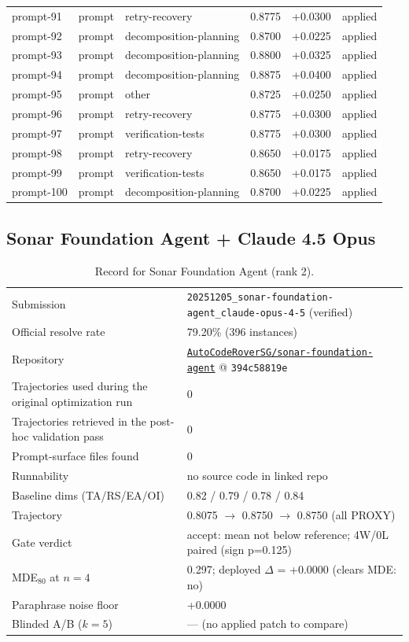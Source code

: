 \begin{center}
\begin{longtable}{llp{5.2cm}rrl}
prompt-91 & prompt & retry-recovery & 0.8775 & +0.0300 & applied \\
prompt-92 & prompt & decomposition-planning & 0.8700 & +0.0225 & applied \\
prompt-93 & prompt & decomposition-planning & 0.8800 & +0.0325 & applied \\
prompt-94 & prompt & decomposition-planning & 0.8875 & +0.0400 & applied \\
prompt-95 & prompt & other & 0.8725 & +0.0250 & applied \\
prompt-96 & prompt & retry-recovery & 0.8775 & +0.0300 & applied \\
prompt-97 & prompt & verification-tests & 0.8775 & +0.0300 & applied \\
prompt-98 & prompt & retry-recovery & 0.8650 & +0.0175 & applied \\
prompt-99 & prompt & verification-tests & 0.8650 & +0.0175 & applied \\
prompt-100 & prompt & decomposition-planning & 0.8700 & +0.0225 & applied \\
\bottomrule\end{longtable}\end{center}
\clearpage
\subsection{Sonar Foundation Agent + Claude 4.5 Opus}
\label{app:agent2}
\begin{table}[h]\centering\scriptsize
\caption{Record for Sonar Foundation Agent (rank 2).}
\begin{tabular}{lp{8.2cm}}\toprule
Submission & \texttt{20251205\_\allowbreak{}sonar-foundation-agent\_\allowbreak{}claude-opus-4-5} (verified) \\
Official resolve rate & 79.20\% (396 instances) \\
Repository & \href{https://github.com/AutoCodeRoverSG/sonar-foundation-agent}{\texttt{AutoCodeRoverSG/sonar-foundation-agent}} @ \texttt{394c58819e} \\
Trajectories used during the original optimization run & 0 \\
Trajectories retrieved in the post-hoc validation pass & 0 \\
Prompt-surface files found & 0 \\
Runnability & no source code in linked repo \\
Baseline dims (TA/RS/EA/OI) & 0.82 / 0.79 / 0.78 / 0.84 \\
Trajectory & 0.8075 $\to$ 0.8750 $\to$ 0.8750 (all PROXY) \\
Gate verdict & accept: mean not below reference; 4W/0L paired (sign p=0.125) \\
MDE$_{80}$ at $n{=}4$ & 0.297; deployed $\Delta$ = +0.0000 (clears MDE: no) \\
Paraphrase noise floor & +0.0000 \\
Blinded A/B ($k{=}5$) & --- (no applied patch to compare) \\
\bottomrule\end{tabular}\end{table}
